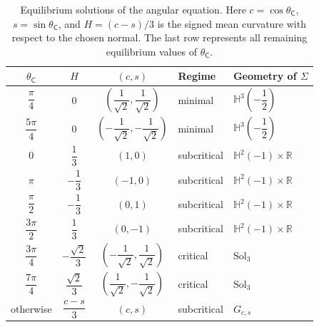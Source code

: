 \documentclass[11pt,a4paper]{amsart}
\theoremstyle{plain}
\theoremstyle{remark}
\newcommand{\R}{\mathbb{R}}
\newcommand{\Hyp}{\mathbb{H}}
\newcommand{\C}{\mathsf{C}}
\begin{document}
\begin{table}[ht]
\centering
\renewcommand{\arraystretch}{1.65}
\setlength{\tabcolsep}{8pt}
\begin{tabular}{@{}cccll@{}}
\toprule
$\theta_\C$ & $H$ & $(c,s)$ & Regime & Geometry of $\Sigma$ \\
\midrule

$\dfrac{\pi}{4}$
&
$0$
&
$\left(\dfrac{1}{\sqrt2},\dfrac{1}{\sqrt2}\right)$
&
minimal
&
$\Hyp^3\!\left(-\dfrac12\right)$
\\
\addlinespace[4pt]

$\dfrac{5\pi}{4}$
&
$0$
&
$\left(-\dfrac{1}{\sqrt2},-\dfrac{1}{\sqrt2}\right)$
&
minimal
&
$\Hyp^3\!\left(-\dfrac12\right)$
\\

\midrule

$0$
&
$\dfrac{1}{3}$
&
$(1,0)$
&
subcritical
&
$\Hyp^2(-1)\times\R$
\\
\addlinespace[4pt]

$\pi$
&
$-\dfrac{1}{3}$
&
$(-1,0)$
&
subcritical
&
$\Hyp^2(-1)\times\R$
\\
\addlinespace[4pt]

$\dfrac{\pi}{2}$
&
$-\dfrac{1}{3}$
&
$(0,1)$
&
subcritical
&
$\Hyp^2(-1)\times\R$
\\
\addlinespace[4pt]

$\dfrac{3\pi}{2}$
&
$\dfrac{1}{3}$
&
$(0,-1)$
&
subcritical
&
$\Hyp^2(-1)\times\R$
\\

\midrule

$\dfrac{3\pi}{4}$
&
$-\dfrac{\sqrt2}{3}$
&
$\left(-\dfrac{1}{\sqrt2},\dfrac{1}{\sqrt2}\right)$
&
critical
&
$\mathrm{Sol}_3$
\\
\addlinespace[4pt]

$\dfrac{7\pi}{4}$
&
$\dfrac{\sqrt2}{3}$
&
$\left(\dfrac{1}{\sqrt2},-\dfrac{1}{\sqrt2}\right)$
&
critical
&
$\mathrm{Sol}_3$
\\

\midrule

otherwise
&
$\dfrac{c-s}{3}$
&
$(c,s)$
&
subcritical
&
$G_{c,s}$
\\

\bottomrule
\end{tabular}
\caption{Equilibrium solutions of the angular equation. Here
$c=\cos\theta_\C$, $s=\sin\theta_\C$, and
$H=(c-s)/3$ is the signed mean curvature with respect to the chosen normal.
The last row represents all remaining equilibrium values of $\theta_\C$.}
\label{tab:equilibria}
\end{table}
\end{document}
